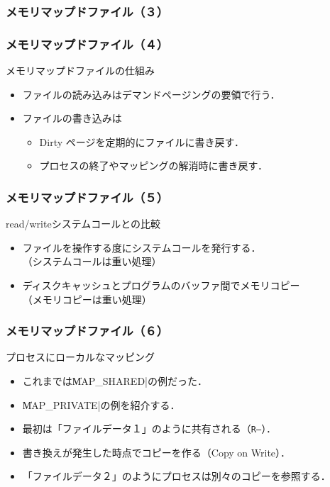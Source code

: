 \documentclass[unicode,handout]{beamer}                   %
\begin{document}
\begin{frame}
  \frametitle{メモリマップドファイル（３）}
\end{frame}

\begin{frame}
  \frametitle{メモリマップドファイル（４）}
  メモリマップドファイルの仕組み
  \vspace{3mm}
  \begin{itemize}
  \item ファイルの読み込みはデマンドページングの要領で行う．
  \item ファイルの書き込みは
    \begin{itemize}
      \item Dirty ページを定期的にファイルに書き戻す．
      \item プロセスの終了やマッピングの解消時に書き戻す．
    \end{itemize}
  \end{itemize}
\end{frame}

\begin{frame}
  \frametitle{メモリマップドファイル（５）}
  read/writeシステムコールとの比較
  \vspace{3mm}
  \begin{itemize}
  \item ファイルを操作する度にシステムコールを発行する．\\
    （システムコールは重い処理）
  \item ディスクキャッシュとプログラムのバッファ間でメモリコピー\\
    （メモリコピーは重い処理）
  \end{itemize}
\end{frame}

\begin{frame}[fragile]
  \frametitle{メモリマップドファイル（６）}
  プロセスにローカルなマッピング
  \vspace{3mm}
  \vspace{-5mm}\begin{itemize}
  \item これまでは\|MAP_SHARED|の例だった．
  \item \|MAP_PRIVATE|の例を紹介する．
  \item 最初は「ファイルデータ１」のように共有される（\texttt{R--}）．
  \item 書き換えが発生した時点でコピーを作る（Copy on Write）．
  \item 「ファイルデータ２」のようにプロセスは別々のコピーを参照する．
  \end{itemize}
\end{frame}
\end{document}
